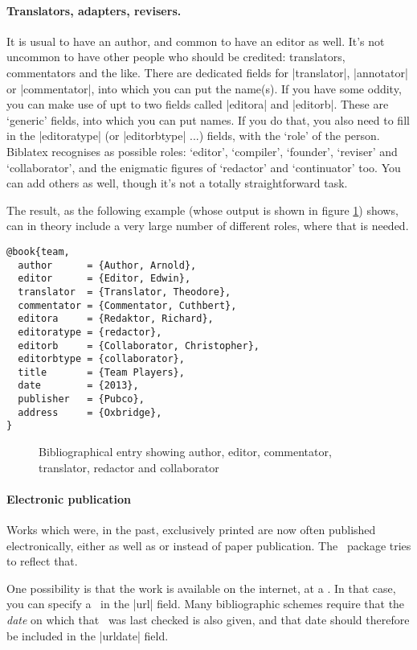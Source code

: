{\paragraph{Translators, adapters, revisers.} It is usual to have an
author, and common to have an editor as well. It's not uncommon to
have other people who should be credited: translators, commentators
and the like. There are dedicated fields for |translator|, |annotator|
or |commentator|, into which you can put the name(s). If you have some
oddity, you can make use of upt to two fields called |editora| and
|editorb|. These are `generic' fields, into which you can put
names. If you do that, you also need to fill in the |editoratype| (or
|editorbtype| ...) fields, with the `role' of the person. Biblatex
recognises as possible roles: `editor', `compiler', `founder',
`reviser' and `collaborator', and the enigmatic figures of `redactor'
and `continuator' too. You can add others as well, though it's not a
totally straightforward task.

The result, as the following example (whose output is shown in figure
\ref{redactors}) shows, can in theory include a very large number of
different roles, where that is needed.
\begin{Verbatim}
@book{team,
  author      = {Author, Arnold},
  editor      = {Editor, Edwin},
  translator  = {Translator, Theodore},
  commentator = {Commentator, Cuthbert},
  editora     = {Redaktor, Richard},
  editoratype = {redactor},
  editorb     = {Collaborator, Christopher},
  editorbtype = {collaborator},
  title       = {Team Players},
  date        = {2013},
  publisher   = {Pubco},
  address     = {Oxbridge},
}
\end{Verbatim}

\begin{figure}
\caption{Bibliographical entry showing author, editor, commentator, translator, redactor and collaborator\label{redactors}}
\end{figure}

\paragraph{Electronic publication} Works which were, in the past,
exclusively printed are now often published electronically, either as
well as or instead of paper publication. The \biblatex\ package tries
to reflect that.

One possibility is that the work is available on the internet, at a
\URL. In that case, you can specify a \URL\ in the |url| field. Many
bibliographic schemes require that the \emph{date} on which that \URL\
was last checked is also given, and that date should therefore be
included in the |urldate| field.

}
